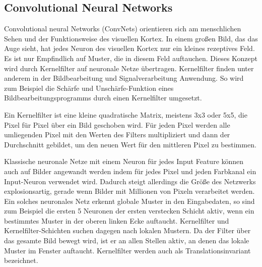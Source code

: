 \subsection{Convolutional Neural Networks}

Convolutional neural Networks (ConvNets) orientieren sich am menschlichen Sehen und der Funktionsweise des visuellen Kortex. In einem großen Bild, das das Auge sieht, hat jedes Neuron des visuellen Kortex nur ein kleines rezeptives Feld. Es ist nur Empfindlich auf Muster, die in diesem Feld auftauchen. Dieses Konzept wird durch Kernelfilter auf neuronale Netze übertragen. Kernelfilter finden unter anderem in der Bildbearbeitung und Signalverarbeitung Anwendung. So wird zum Beispiel die Schärfe und Unschärfe-Funktion eines Bildbearbeitungsprogramms durch einen Kernelfilter umgesetzt. 


Ein Kernelfilter ist eine kleine quadratische Matrix, meistens 3x3 oder 5x5, die Pixel für Pixel über ein Bild geschoben wird. Für jeden Pixel werden alle umliegenden Pixel mit den Werten des Filters multipliziert und dann der Durchschnitt gebildet, um den neuen Wert für den mittleren Pixel zu bestimmen. 

Klassische neuronale Netze mit einem Neuron für jedes Input Feature können auch auf Bilder angewandt werden indem für jedes Pixel und jeden Farbkanal ein Input-Neuron verwendet wird. Dadurch steigt allerdings die Größe des Netzwerks explosionsartig, gerade wenn Bilder mit Millionen von Pixeln verarbeitet werden. Ein solches neuronales Netz erkennt globale Muster in den Eingabedaten, so sind zum Beispiel die ersten 5 Neuronen der ersten verstecken Schicht aktiv, wenn ein bestimmtes Muster in der oberen linken Ecke auftaucht. Kernelfilter und Kernelfilter-Schichten suchen dagegen nach lokalen Mustern. Da der Filter über das gesamte Bild bewegt wird, ist er an allen Stellen aktiv, an denen das lokale Muster im Fenster auftaucht. Kernelfilter werden auch als Translationsinvariant bezeichnet.